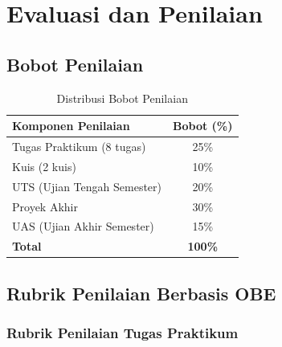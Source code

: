 \documentclass[a4paper,12pt]{article}
\begin{document}
\section{Evaluasi dan Penilaian}

\subsection{Bobot Penilaian}

\begin{table}[h]
\centering
\caption{Distribusi Bobot Penilaian}
\label{tab:bobot_penilaian}
\begin{tabular}{|l|c|}
\hline
\textbf{Komponen Penilaian} & \textbf{Bobot (\%)} \\
\hline
Tugas Praktikum (8 tugas) & 25\% \\
Kuis (2 kuis) & 10\% \\
UTS (Ujian Tengah Semester) & 20\% \\
Proyek Akhir & 30\% \\
UAS (Ujian Akhir Semester) & 15\% \\
\hline
\textbf{Total} & \textbf{100\%} \\
\hline
\end{tabular}
\end{table}

\subsection{Rubrik Penilaian Berbasis OBE}

\subsubsection{Rubrik Penilaian Tugas Praktikum}
\end{document}
